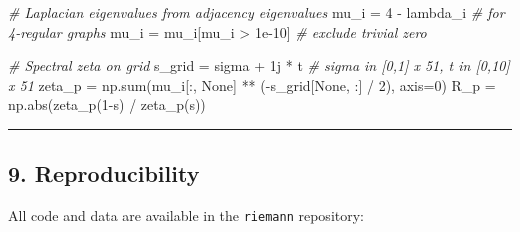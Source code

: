 \documentclass[
]{article}
\newenvironment{Shaded}{}{}
\newcommand{\BuiltInTok}[1]{\textcolor[rgb]{0.00,0.50,0.00}{#1}}
\newcommand{\CommentTok}[1]{\textcolor[rgb]{0.38,0.63,0.69}{\textit{#1}}}
\newcommand{\DecValTok}[1]{\textcolor[rgb]{0.25,0.63,0.44}{#1}}
\newcommand{\FloatTok}[1]{\textcolor[rgb]{0.25,0.63,0.44}{#1}}
\newcommand{\NormalTok}[1]{#1}
\newcommand{\OperatorTok}[1]{\textcolor[rgb]{0.40,0.40,0.40}{#1}}
\newcommand{\OtherTok}[1]{\textcolor[rgb]{0.00,0.44,0.13}{#1}}
\newcommand{\VariableTok}[1]{\textcolor[rgb]{0.10,0.09,0.49}{#1}}
\begin{document}
\begin{Shaded}
\begin{Highlighting}[]
\CommentTok{\# Laplacian eigenvalues from adjacency eigenvalues}
\NormalTok{mu\_i }\OperatorTok{=} \DecValTok{4} \OperatorTok{{-}}\NormalTok{ lambda\_i  }\CommentTok{\# for 4{-}regular graphs}
\NormalTok{mu\_i }\OperatorTok{=}\NormalTok{ mu\_i[mu\_i }\OperatorTok{\textgreater{}} \FloatTok{1e{-}10}\NormalTok{]  }\CommentTok{\# exclude trivial zero}

\CommentTok{\# Spectral zeta on grid}
\NormalTok{s\_grid }\OperatorTok{=}\NormalTok{ sigma }\OperatorTok{+} \OtherTok{1j} \OperatorTok{*}\NormalTok{ t  }\CommentTok{\# sigma in [0,1] x 51, t in [0,10] x 51}
\NormalTok{zeta\_p }\OperatorTok{=}\NormalTok{ np.}\BuiltInTok{sum}\NormalTok{(mu\_i[:, }\VariableTok{None}\NormalTok{] }\OperatorTok{**}\NormalTok{ (}\OperatorTok{{-}}\NormalTok{s\_grid[}\VariableTok{None}\NormalTok{, :] }\OperatorTok{/} \DecValTok{2}\NormalTok{), axis}\OperatorTok{=}\DecValTok{0}\NormalTok{)}
\NormalTok{R\_p }\OperatorTok{=}\NormalTok{ np.}\BuiltInTok{abs}\NormalTok{(zeta\_p(}\DecValTok{1}\OperatorTok{{-}}\NormalTok{s) }\OperatorTok{/}\NormalTok{ zeta\_p(s))}
\end{Highlighting}
\end{Shaded}

\begin{center}\rule{0.5\linewidth}{0.5pt}\end{center}

\hypertarget{reproducibility}{%
\subsection{9. Reproducibility}\label{reproducibility}}

All code and data are available in the \texttt{riemann} repository:
\end{document}
